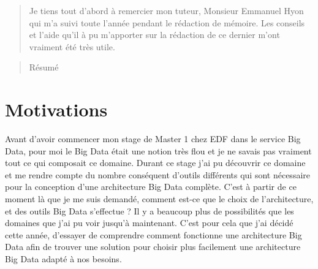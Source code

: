 \documentclass[12pt, twoside, openright]{report}
\newenvironment{acknowledgements} {\renewcommand\abstractname{Remerciements}\begin{abstract}} {\end{abstract}}
\begin{document}
\leavevmode\thispagestyle{empty}\newpage


\begin{acknowledgements}

Je tiens tout d'abord à remercier mon tuteur, Monsieur Emmanuel Hyon qui m'a suivi toute l'année pendant le rédaction de mémoire. Les conseils et l'aide qu'il à pu m'apporter sur la rédaction de ce dernier m'ont vraiment été très utile.

\end{acknowledgements}

\leavevmode\thispagestyle{empty}\newpage


\begin{abstract}
	Résumé
\end{abstract}

\leavevmode\thispagestyle{empty}\newpage


\section*{Motivations}
Avant d'avoir commencer mon stage de Master 1 chez EDF dans le service Big Data, pour moi le Big Data était une notion très flou et je ne savais pas vraiment tout ce qui composait ce domaine. Durant ce stage j'ai pu découvrir ce domaine et me rendre compte du nombre conséquent d'outils différents qui sont nécessaire pour la conception d'une architecture Big Data complète. C'est à partir de ce moment là que je me suis demandé, comment est-ce que le choix de l'architecture, et des outils Big Data s'effectue ? Il y a beaucoup plus de possibilités que les domaines que j'ai pu voir jusqu'à maintenant. C'est pour cela que j'ai décidé cette année, d'essayer de comprendre comment fonctionne une architecture Big Data afin de trouver une solution pour choisir plus facilement une architecture Big Data adapté à nos besoins. 
\end{document}
